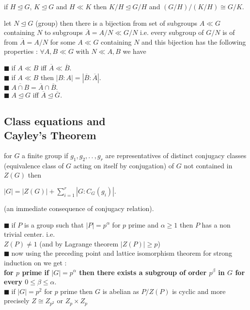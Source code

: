 \documentclass[11pt]{extarticle}
\newcommand{\ck}{.\,.\,}
\newcommand{\sm}[2]{\displaystyle\sum_{#1}^{#2}}
\newcommand{\snote}[1]{{\footnotesize(#1)}}
\newcommand{\y}{$\blacksquare\;$}
\newcommand{\tbx}[2][]{
	\begin{tcolorbox}[enhanced,breakable,size=small,colback=black!2!white,title={#1},arc is angular, arc=1.5mm,drop fuzzy shadow]
		#2
	\end{tcolorbox}
}
\begin{document}
\begin{multicols}{2}
	\tbx[Third Isomorphism Theorem\\ (\textbf{quotient of quotient}) ]{if $ H\trianglelefteq G $,
		$ K \trianglelefteq G $ and $ H\ll K $ then $ K/H\trianglelefteq G/H $ and 
		$ (G/H)/(K/H)\cong G/K .$
	}
	\tbx[Fourth Isomorphism Theorem (\textbf{lattice}) ]{ let $N\trianglelefteq G $ (group) then there 
		is a bijection from set of subgroups $ A \ll G$ containing $ N $ to subgroups 
		$ \overline{A}=A/N \ll G/N$ i.e. every subgroup of $ G/N $ is of from $ \overline{A}=A/N $ for some 
		$ A\ll G $ containing $ N $ and this bijection has the following properties : 
		$ \forall A,B \ll G $ with $ N\ll A,B $ we have 
		
			\y  if $ A\ll B $ iff $ \overline{A} \ll \overline{B} $. \\
			\y  if $ A\ll B $ then $ |B:A|=|\overline{B}:\overline{A}| .$ \\
			\y  $ \overline{A\cap B}= \overline{A}\cap \overline{B}. $  \\
			\y  $ A\trianglelefteq G $ iff $ \overline{A} \trianglelefteq \overline{G}. $ 
		
	}
	\subsection{ Class equations and \\ Cayley's Theorem }
	
	\tbx[\textbf{The Class Equation} ]{for $ G $ a finite group if $ g_1,g_2,\ck , g_r $ are representatives of distinct conjugacy classes \snote{equivalence class of $ G $ acting on itself by conjugation} of $ G $ not contained in 
		$ Z(G) $ then 
		\begin{center}
			$  |G|=|Z(G)|+\sm{i=1}{r}|G:C_G(g_i)|.$
		\end{center} (an immediate consequence of conjugacy relation).
	}
	\tbx[Consequences of  Class equations :]{
		
		\y  if $ P $ is a group such that $ |P|=p^\alpha $ for $ p $ prime and $ \alpha \geq 1 $  then $ P $ has  
		a non trivial center. i.e. \\
		$ Z(P)\neq 1 $ (and by Lagrange theorem $ |Z(P) |\geq p $)\\
		\y  	now using the preceding point and lattice isomorphism theorem for strong induction on we get : \\ 
		\textbf{for $ p $ prime if $ |G|=p^\alpha $ then there exists a subgroup of order $ p^\beta $ in $ G $ for every
			$ 0\leq \beta \leq \alpha .$}\\
		\y  if $ |G|=p^2 $ for $ p $ prime then $ G $ is abelian as $ P/Z(P) $ is cyclic and more precisely  
		$ Z\cong Z_{p^2} $ or $ Z_p \times Z_p $
	}
	

\end{multicols}
\end{document}
